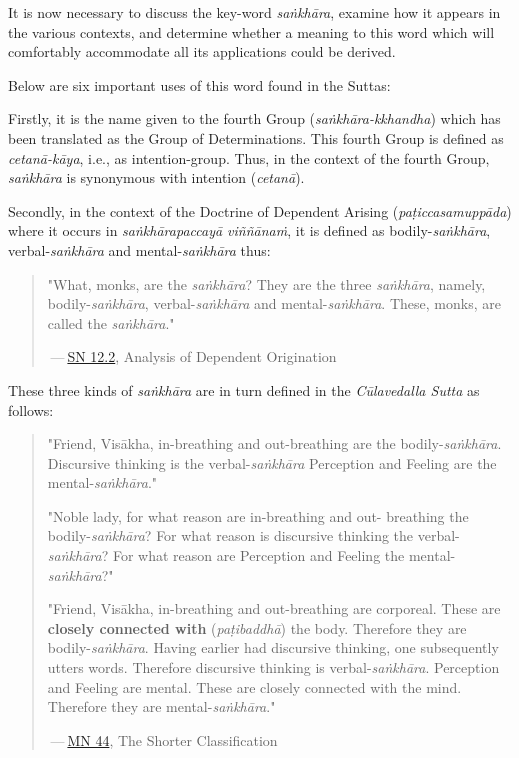 It is now necessary to discuss the key-word \emph{saṅkhāra}, examine how it appears in the various contexts, and determine whether a meaning to this word which will comfortably accommodate all its applications could be derived.

Below are six important uses of this word found in the Suttas:

Firstly, it is the name given to the fourth Group (\emph{saṅkhāra-kkhandha}) which has been translated as the Group of Determinations. This fourth Group is defined as \emph{cetanā-kāya}, i.e., as intention-group. Thus, in the context of the fourth Group, \emph{saṅkhāra} is synonymous with intention (\emph{cetanā}).

Secondly, in the context of the Doctrine of Dependent Arising (\emph{paṭiccasamuppāda}) where it occurs in \emph{saṅkhārapaccayā viññānaṁ}, it is defined as bodily-\emph{saṅkhāra}, verbal-\emph{saṅkhāra} and mental-\emph{saṅkhāra} thus:

\begin{quote}
"What, monks, are the \emph{saṅkhāra}? They are the three \emph{saṅkhāra}, namely, bodily-\emph{saṅkhāra}, verbal-\emph{saṅkhāra} and mental-\emph{saṅkhāra}. These, monks, are called the \emph{saṅkhāra}."

 --- \href{https://suttacentral.net/sn12.2/en/bodhi}{SN 12.2}, Analysis of Dependent Origination
\end{quote}

These three kinds of \emph{saṅkhāra} are in turn defined in the \emph{Cūlavedalla Sutta} as follows:

\begin{quote}
"Friend, Visākha, in-breathing and out-breathing are the bodily-\emph{saṅkhāra}. Discursive thinking is the verbal-\emph{saṅkhāra} Perception and Feeling are the mental-\emph{saṅkhāra}."

"Noble lady, for what reason are in-breathing and out- breathing the bodily-\emph{saṅkhāra}? For what reason is discursive thinking the verbal-\emph{saṅkhāra}? For what reason are Perception and Feeling the mental-\emph{saṅkhāra}?"

"Friend, Visākha, in-breathing and out-breathing are corporeal. These are \textbf{closely connected with} (\emph{paṭibaddhā}) the body. Therefore they are bodily-\emph{saṅkhāra}. Having earlier had discursive thinking, one subsequently utters words. Therefore discursive thinking is verbal-\emph{saṅkhāra}. Perception and Feeling are mental. These are closely connected with the mind. Therefore they are mental-\emph{saṅkhāra}."

 --- \href{https://suttacentral.net/mn44/en/sujato}{MN 44}, The Shorter Classification
\end{quote}

